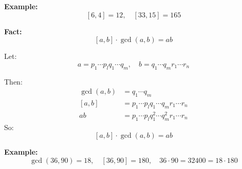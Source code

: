 \textbf{Example:}
\[
	[6, 4] = 12, \quad [33, 15] = 165
\]

\textbf{Fact:}
\[
	[a, b] \cdot \gcd(a, b) = ab
\]

Let:
\[
	a = p_1 \cdots p_lq_1 \cdots q_m, \quad b = q_1 \cdots q_mr_1 \cdots r_n
\]

Then:
\begin{align*}
	\gcd(a, b) & = q_1 \cdots q_m                                 \\
	[a, b]     & = p_1 \cdots p_lq_1 \cdots q_mr_1 \cdots r_n     \\
	ab         & = p_1 \cdots p_lq_1^2 \cdots q_m^2r_1 \cdots r_n
\end{align*}
So:
\[
	[a, b] \cdot \gcd(a, b) = ab
\]

\textbf{Example:}
\[
	\gcd(36, 90) = 18, \quad [36, 90] = 180, \quad 36 \cdot 90 = 32400 = 18 \cdot 180
\]
